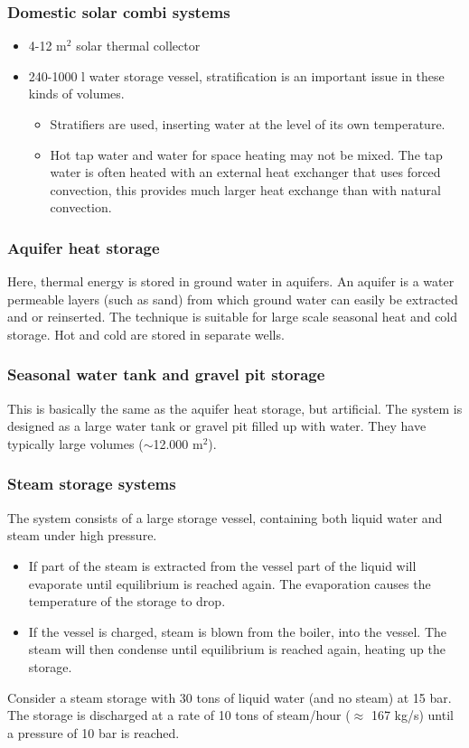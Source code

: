 \documentclass[a4paper,10pt]{article}
\begin{document}
\subsubsection{Domestic solar combi systems}

\begin{itemize}
 \item 4-12 m$^2$ solar thermal collector
 \item 240-1000 l water storage vessel, stratification is an important issue in these kinds of volumes.
 \begin{itemize}
 \item Stratifiers are used, inserting water at the level of its own temperature.
 \item Hot tap water and water for space heating may not be mixed. The tap water is often heated with an external heat exchanger that uses forced convection, this provides much larger heat exchange than with natural convection.
 \end{itemize}
\end{itemize}

\subsubsection{Aquifer heat storage}
Here, thermal energy is stored in ground water in aquifers. An aquifer is a water permeable layers (such as sand) from which ground water can easily be extracted and or reinserted. The technique is suitable for large scale seasonal heat and cold storage. Hot and cold are stored in separate wells.

\subsubsection{Seasonal water tank and gravel pit storage}
This is basically the same as the aquifer heat storage, but artificial.  The system is designed as a large water tank or gravel pit filled up with water. They have typically large volumes ($\sim$12.000 m$^2$).

\subsubsection{Steam storage systems}
The system consists of a large storage vessel, containing both liquid water and steam under high pressure.
\begin{itemize}
 \item If part of the steam is extracted from the vessel part of the liquid will evaporate until equilibrium is reached again. The evaporation causes the temperature of the storage to drop.
 \item If the vessel is charged, steam is blown from the boiler, into the vessel. The steam will then condense until equilibrium is reached again, heating up the storage.
\end{itemize}
Consider a steam storage with 30 tons of liquid water (and no steam) at 15 bar. The storage is discharged at a rate of 10 tons of steam/hour ($\approx$ 167 kg/s) until a pressure of 10 bar is reached. \bigskip
\end{document}
